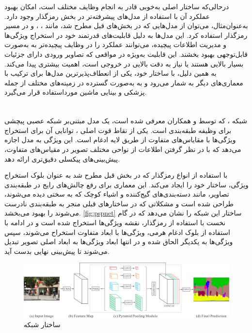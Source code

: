 درحالی‌که ساختار اصلی  به‌خوبی قادر به انجام وظایف مختلف است، امکان بهبود عملکرد آن با استفاده از مدل‌های پیشرفته‌تر در بخش رمزگذار وجود دارد. به‌عنوان‌مثال، می‌توان از مدل‌هایی که در بخش‌های قبل مطرح شد،‌ مانند
 ، ،  و 
  در مسیر رمزگذار
   استفاده کرد. این مدل‌ها به دلیل قابلیت‌های قدرتمند خود در استخراج ویژگی‌ها و مدیریت اطلاعات پیچیده، می‌توانند عملکرد
    را در وظایف پیچیده‌تر به به‌صورت قابل‌توجهی بهبود بخشند. 
این قابلیت به‌ویژه در مواقعی که تصاویر ورودی دارای جزئیات بسیار بالایی هستند یا نیاز به دقت بالایی در خروجی است، اهمیت بیشتری پیدا می‌کند. به همین دلیل،  با ساختار خود، یکی از انعطاف‌پذیرترین مدل‌ها برای ترکیب با معماری‌های دیگر به شمار می‌رود و به ‌به‌صورت گسترده در زمینه‌های مختلف از جمله پزشکی و بینایی ماشین مورداستفاده قرار می‌گیرد.


\section{}

شبکه
،
 که توسط
  \cite{zhao2017pyramid}
   و همکاران  معرفی شده است، یک مدل مبتنی‌بر شبکه عصبی پیچشی برای وظیفه طبقه‌بندی است. یکی از نقاط قوت اصلی
    ،
      توانایی آن برای استخراج ویژگی‌ها با مقایاس‌های متفاوت از طریق لایه ادغام است. این ویژگی به مدل اجازه می‌دهد که با در نظر گرفتن اطلاعات از نواحی مختلف تصویر در مقیاس‌های متفاوت، پیش‌بینی‌های پیکسلی دقیق‌تری ارائه دهد.

 با استفاده از انواع رمزگذار که در بخش قبل مطرح شد به عنوان بلوک استخراج ویژگی، ساختار خود را ایجاد می‌کند. این معماری برای رفع چالش‌های رایج در طبقه‌بندی تصاویر، مانند دسته‌بندی‌های گیج‌کننده و اشیاء کوچک که به سختی دیده می‌شوند، طراحی شده است و مشکلاتی که در ساختارهای قبلی منجر به طبقه‌بندی نادرست می‌شوند را بهبود می‌بخشد.
\autoref{fig:pspnet}
ساختار این شبکه را نشان می‌دهد که در گام نخست با استفاده از رمزگذار،‌ نقشه ویژگی‌ها استخراج شده است و در ادامه با استفاده از بلوک ادغام هرمی، ویژگی‌ها با ابعاد متفاوت استخراح می‌شوند، سپس ویژگی‌ها به یکدیگر الحاق شده و در انتها ابعاد ویژگی‌ها به ابعاد اصلی تصویر تبدیل می‌شوند تا پیش‌بینی نهایی بدست آید.

\begin{figure}[h]
\centering
\includegraphics[width=1.0\linewidth]{Images/Chapter2/PSPNet}
\caption{ساختار شبکه 
\cite{zhao2017pyramid}}
\label{fig:pspnet}
\end{figure}

